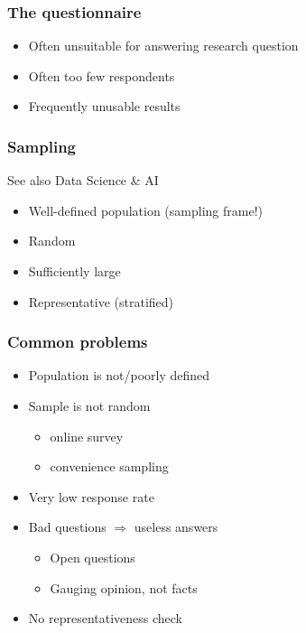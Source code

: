 \documentclass[aspectratio=169]{beamer}
\begin{document}
\begin{frame}
  \frametitle{The questionnaire}


  \bigskip

  \begin{itemize}
    \item Often unsuitable for answering research question
    \item Often too few respondents
    \item Frequently unusable results
  \end{itemize}

\end{frame}

\begin{frame}
  \frametitle{Sampling}

  See also Data Science \& AI

  \begin{itemize}
    \item Well-defined population (sampling frame!)
    \item Random
    \item Sufficiently large
    \item Representative (stratified)
  \end{itemize}

\end{frame}

\begin{frame}
  \frametitle{Common problems}

  \begin{itemize}
    \item Population is not/poorly defined
    \item Sample is not random
          \begin{itemize}
            \item online survey
            \item convenience sampling
          \end{itemize}
    \item Very low response rate
    \item Bad questions $\Rightarrow$ useless answers
          \begin{itemize}
            \item Open questions
            \item Gauging opinion, not facts
          \end{itemize}
    \item No representativeness check
  \end{itemize}

\end{frame}
\end{document}
